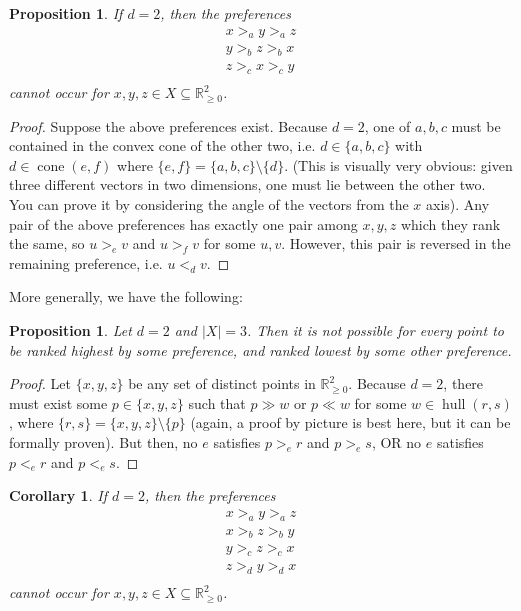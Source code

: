 \documentclass[12pt]{article}
\newtheorem{proposition}[theorem]{Proposition}
\newtheorem{corollary}[theorem]{Corollary}
\newcommand{\Rgz}{\mathbb{R}_{\ge 0}}
\DeclareMathOperator*{\cone}{cone}
\DeclareMathOperator*{\hull}{hull}
\newcommand{\1}[1]{\mathds{1}[{#1}]}
\begin{document}
  \begin{proposition}
    If $d=2$, then the preferences
    \begin{align*}
      x >_a y >_a z \\
      y >_b z >_b x\\
      z >_c x >_c y\\
    \end{align*}
    cannot occur for $x,y,z\in X\subseteq \Rgz^2$.
  \end{proposition}
  \begin{proof}
    Suppose the above preferences exist.
    Because $d=2$, one of $a,b,c$ must be contained in the
    convex cone of the other two, i.e. $d \in \{a,b,c\}$
    with $d \in \cone(e,f)$ where $\{e,f\} = \{a,b,c\} \setminus \{d\}$.
    (This is visually very obvious: given three different
    vectors in two dimensions, one must lie between the other two.
    You can prove it by considering the angle of the vectors from the $x$ axis).
    Any pair of the above preferences has exactly one pair
    among $x,y,z$ which they rank the same, so
    $u >_e v$ and $u >_f v$ for some $u,v$.
    However, this pair is reversed in the remaining preference, i.e. $u <_d v$.
  \end{proof}

  More generally, we have the following:
  \begin{proposition}
    Let $d=2$ and $|X| = 3$. Then it is not possible
    for every point to be ranked highest by some preference,
    and ranked lowest by some other preference.
  \end{proposition}
  \begin{proof}
    Let $\{x,y,z\}$ be any set of distinct points in $\Rgz^2$.
    Because $d=2$, there must exist some $p\in \{x,y,z\}$
    such that $p \gg w$ or $p \ll w$ for some
    $w \in \hull(r,s)$, where $\{r,s\} = \{x,y,z\} \setminus \{p\}$
    (again, a proof by picture is best here, but it can be formally proven).
    But then, no $e$ satisfies $p >_e r$ and $p >_e s$,
    OR no $e$ satisfies $p <_e r$ and $p <_e s$.
  \end{proof}
  \begin{corollary}
    If $d=2$, then the preferences
    \begin{align*}
      x >_a y >_a z \\
      x >_b z >_b y \\
      y >_c z >_c x \\
      z >_d y >_d x \\
    \end{align*}
    cannot occur for $x,y,z\in X\subseteq \Rgz^2$.
  \end{corollary}
\end{document}
